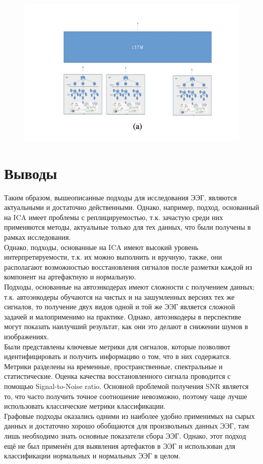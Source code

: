 \documentclass[12pt, a4paper, titlepage]{extreport}
\begin{document}
	\begin{figure}
		\centering
		\includegraphics[width=0.7\linewidth]{3_step}
	\end{figure}
	\section*{Выводы}
	Таким образом, вышеописанные подходы для исследования ЭЭГ, являются актуальными и достаточно действенными. Однако, например, подход, основанный на ICA имеет проблемы с реплицируемостью, т.к. зачастую среди них применяются методы, актуальные только для тех данных, что были получены в рамках исследования.\\
	Однако, подходы, основанные на ICA имеют высокий уровень интерпретируемости, т.к. их можно выполнить и вручную, также, они располагают возможностью восстановления сигналов после разметки каждой из компонент на артефактную и нормальную.\\
	Подходы, основанные на автоэнкодерах имеют сложности с получением данных: т.к. автоэнкодеры обучаются на чистых и на зашумленных версиях тех же сигналов, то получение двух видов одной и той же ЭЭГ является сложной задачей и малоприменимо на практике. Однако, автоэнкодеры в перспективе могут показать наилучший результат, как они это делают в снижении шумов в изображениях.\\
	Были представлены ключевые метрики для сигналов, которые позволяют идентифицировать и получить информацию о том, что в них содержатся. Метрики разделены на временные, пространственные, спектральные и статистические. Оценка качества восстановленного сигнала проводится с помощью Signal-to-Noise ratio. Основной проблемой получения SNR является то, что часто получить точное соотношение невозможно, поэтому чаще лучше использовать классические метрики классификации.\\
	Графовые подходы оказались одними из наиболее удобно применимых на сырых данных и достаточно хорошо обобщаются для произвольных данных ЭЭГ, там лишь необходимо знать основные показатели сбора ЭЭГ. Однако, этот подход ещё не был применён для выявления артефактов в ЭЭГ и использован для классификации нормальных и нормальных ЭЭГ в целом.
\end{document}
